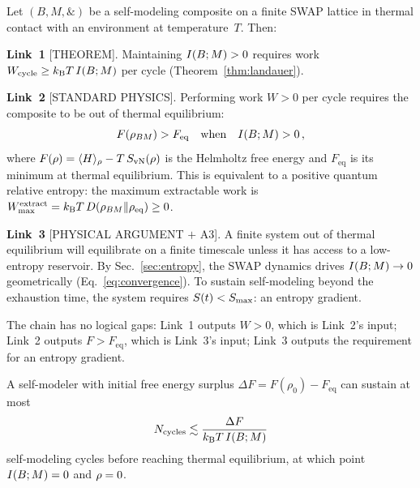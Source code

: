 \begin{proposition}\label{prop:chain}
Let $(B,M,\mathbin{\&})$ be a self-modeling composite on a finite
SWAP lattice in thermal contact with an environment at
temperature~$T$.  Then:

\medskip\noindent
\textbf{Link~1} \textup{[THEOREM].}\enspace
Maintaining $I(B;M) > 0$ requires work
$W_{\mathrm{cycle}} \geq k_{\mathrm{B}} T\,I(B;M)$ per cycle
\textup{(Theorem~\ref{thm:landauer})}.

\medskip\noindent
\textbf{Link~2} \textup{[STANDARD PHYSICS].}\enspace
Performing work $W > 0$ per cycle requires the composite to be out
of thermal equilibrium:
\begin{equation}
  F(\rho_{BM}) > F_{\mathrm{eq}}
  \quad\text{when}\quad I(B;M) > 0 \,,
  \label{eq:link2}
\end{equation}
where $F(\rho) = \langle H\rangle_\rho - T\,S_{\mathrm{vN}}(\rho)$ is the
Helmholtz free energy and $F_{\mathrm{eq}}$ is its minimum at
thermal equilibrium.  This is equivalent to a positive quantum
relative entropy: the maximum extractable work is
$W_{\max}^{\mathrm{extract}} = k_{\mathrm{B}} T\, D(\rho_{BM}\|\rho_{\mathrm{eq}})
\geq 0$.

\medskip\noindent
\textbf{Link~3} \textup{[PHYSICAL ARGUMENT $+$ A3].}\enspace
A finite system out of thermal equilibrium will equilibrate on a
finite timescale unless it has access to a low-entropy reservoir.
By Sec.~\ref{sec:entropy}, the SWAP dynamics drives
$I(B;M) \to 0$ geometrically
\textup{(Eq.~\eqref{eq:convergence})}.
To sustain self-modeling beyond the exhaustion time, the system
requires $S(t) < S_{\max}$: an entropy gradient.
\end{proposition}

\noindent
The chain has no logical gaps: Link~1 outputs $W > 0$, which is
Link~2's input; Link~2 outputs $F > F_{\mathrm{eq}}$, which is
Link~3's input; Link~3 outputs the requirement for an entropy
gradient.

\begin{corollary}\label{cor:exhaustion}
A self-modeler with initial free energy surplus
$\Delta F = F(\rho_0) - F_{\mathrm{eq}}$ can sustain at most
\begin{equation}
  N_{\mathrm{cycles}}
  \lesssim \frac{\Delta F}{k_{\mathrm{B}} T\,I(B;M)}
  \label{eq:exhaustion}
\end{equation}
self-modeling cycles before reaching thermal equilibrium, at which
point $I(B;M) = 0$ and $\rho = 0$.
\end{corollary}

